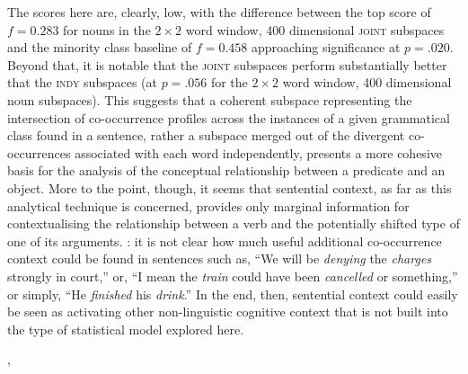 The scores here are, clearly, low, with the difference between the top score of $f = 0.283$ for nouns in the $2 \times 2$ word window, 400 dimensional \textsc{joint} subspaces and the minority class baseline of $f = 0.458$ approaching significance at $p = .020$.  Beyond that, it is notable that the \textsc{joint} subspaces perform substantially better that the \textsc{indy} subspaces (at $p = .056$ for the $2 \times 2$ word window, 400 dimensional noun subspaces).  This suggests that a coherent subspace representing the intersection of co-occurrence profiles across the instances of a given grammatical class found in a sentence, rather a subspace merged out of the divergent co-occurrences associated with each word independently, presents a more cohesive basis for the analysis of the conceptual relationship between a predicate and an object.  More to the point, though, it seems that sentential context, as far as this analytical technique is concerned, provides only marginal information for contextualising the relationship between a verb and the potentially shifted type of one of its arguments.   : it is not clear how much useful additional co-occurrence context could be found in sentences such as, ``We will be \emph{denying} the \emph{charges} strongly in court,'' or, ``I mean the \emph{train} could have been \emph{cancelled} or something,'' or simply, ``He \emph{finished} his \emph{drink}.''  In the end, then, sentential context could easily be seen as activating other non-linguistic cognitive context that is not built into the type of statistical model explored here.

 \citep{BleiEA2003}, 

